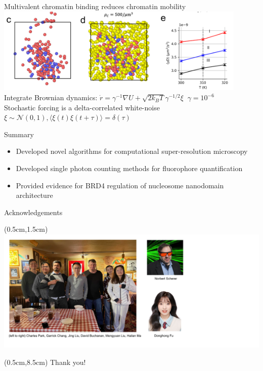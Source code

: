 \documentclass{beamer}					%
\begin{document}
\begin{frame}{Multivalent chromatin binding reduces chromatin mobility}
\includegraphics[width=12cm]{../../brd4/brd4/media/MD-2}
Integrate Brownian dynamics: $\dot{r} = \gamma^{-1}\nabla U + \sqrt{2 k_{B}T}\gamma^{-1/2}\xi \;\; \gamma = 10^{-6}$\\
\vspace{1cm}
Stochastic forcing is a delta-correlated white-noise $\xi \sim \mathcal{N}(0,1), \langle \xi(t)\xi(t+\tau)\rangle = \delta(\tau)$
\end{frame}

\begin{frame}{Summary}
\begin{itemize}
\item Developed novel algorithms for computational super-resolution microscopy
\item Developed single photon counting methods for fluorophore quantification
\item Provided evidence for BRD4 regulation of nucleosome nanodomain architecture
\end{itemize}
\end{frame}


\begin{frame}{Acknowledgements}
\begin{textblock*}{16cm}(0.5cm,1.5cm)
\includegraphics[width=16cm]{../../dissertation/dissertation/media/Lab.png}
\end{textblock*}

\begin{textblock*}{14cm}(0.5cm,8.5cm)
Thank you!
\end{textblock*}

\end{frame}
\end{document}
